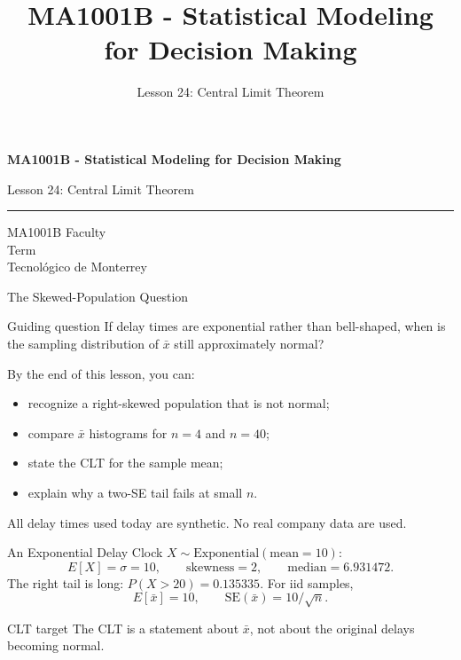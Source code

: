 \documentclass[aspectratio=169,10pt,english]{beamer}
\title{MA1001B - Statistical Modeling for Decision Making}
\subtitle{Lesson 24: Central Limit Theorem}
\author{}
\institute{Tecnol\'ogico de Monterrey}
\date{}
\begin{document}
\begin{frame}[plain]
  \vspace{1.2cm}
  {\Large\bfseries MA1001B - Statistical Modeling for Decision Making\par}
  \vspace{0.7cm}
  {\large Lesson 24: Central Limit Theorem\par}
  \vspace{0.7cm}
  {\color{TecRojo}\rule{\textwidth}{1.2pt}}
  \vspace{0.8cm}

  MA1001B Faculty\\[0.3cm]
  Term\\[0.3cm]
  Tecnol\'ogico de Monterrey
\end{frame}

\begin{frame}{The Skewed-Population Question}
  \begin{alertblock}{Guiding question}
    If delay times are exponential rather than bell-shaped, when is the
    sampling distribution of $\bar x$ still approximately normal?
  \end{alertblock}

  \vspace{0.6em}
  By the end of this lesson, you can:
  \begin{itemize}
    \item recognize a right-skewed population that is not normal;
    \item compare $\bar x$ histograms for $n=4$ and $n=40$;
    \item state the CLT for the sample mean;
    \item explain why a two-SE tail fails at small $n$.
  \end{itemize}

  \vfill
  \scriptsize All delay times used today are synthetic. No real company data are used.
\end{frame}

\begin{frame}{An Exponential Delay Clock}
  \small
  $X\sim\mathrm{Exponential}(\text{mean}=10)$:
  \[
    E[X]=\sigma=10,\qquad \text{skewness}=2,\qquad \text{median}=6.931472.
  \]
  The right tail is long: $P(X>20)=0.135335$.
  For iid samples,
  \[
    E[\bar x]=10,\qquad \mathrm{SE}(\bar x)=10/\sqrt{n}.
  \]

  \vspace{0.3em}
  \begin{exampleblock}{CLT target}
    The CLT is a statement about $\bar x$, not about the original delays
    becoming normal.
  \end{exampleblock}
\end{frame}
\end{document}
